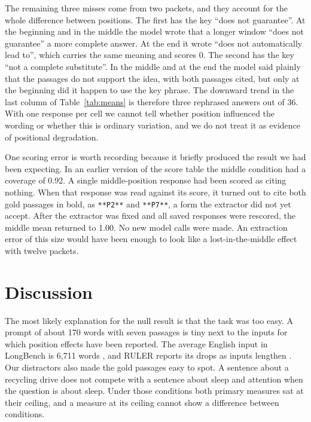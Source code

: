 \documentclass[11pt,a4paper]{article}
\begin{document}
The remaining three misses come from two packets, and they account for the whole difference between positions.
The first has the key ``does not guarantee''.
At the beginning and in the middle the model wrote that a longer window ``does not guarantee'' a more complete answer.
At the end it wrote ``does not automatically lead to'', which carries the same meaning and scores 0.
The second has the key ``not a complete substitute''.
In the middle and at the end the model said plainly that the passages do not support the idea, with both passages cited,
but only at the beginning did it happen to use the key phrase.
The downward trend in the last column of Table~\ref{tab:means} is therefore three rephrased answers out of 36.
With one response per cell we cannot tell whether position influenced the wording or whether this is ordinary variation,
and we do not treat it as evidence of positional degradation.

One scoring error is worth recording because it briefly produced the result we had been expecting.
In an earlier version of the score table the middle condition had a coverage of 0.92.
A single middle-position response had been scored as citing nothing.
When that response was read against its score, it turned out to cite both gold passages in bold,
as \texttt{**P2**} and \texttt{**P7**}, a form the extractor did not yet accept.
After the extractor was fixed and all saved responses were rescored, the middle mean returned to 1.00.
No new model calls were made.
An extraction error of this size would have been enough to look like a lost-in-the-middle effect with twelve packets.

\section{Discussion}
\label{sec:discussion}

The most likely explanation for the null result is that the task was too easy.
A prompt of about 170 words with seven passages is tiny next to the inputs for which position effects have been reported.
The average English input in LongBench is 6,711 words \citep{bai2024longbench},
and RULER reports its drops as inputs lengthen \citep{hsieh2024ruler}.
Our distractors also made the gold passages easy to spot.
A sentence about a recycling drive does not compete with a sentence about sleep and attention when the question is about sleep.
Under those conditions both primary measures sat at their ceiling, and a measure at its ceiling cannot show a difference between conditions.
\end{document}

